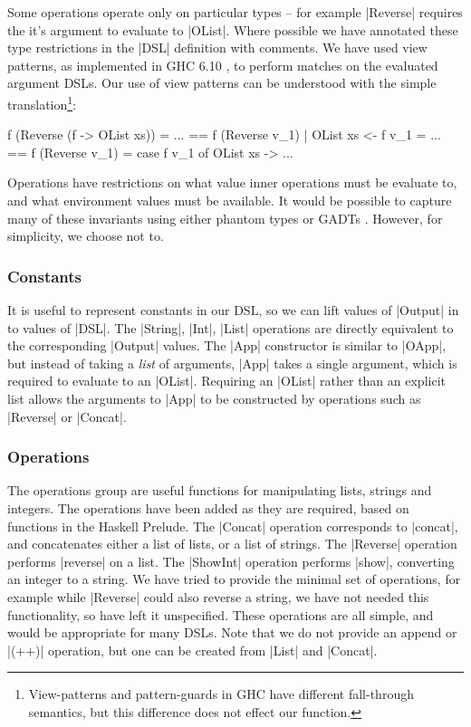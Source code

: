 \documentclass[preprint,draft]{sigplanconf}
\begin{document}
Some operations operate only on particular types -- for example |Reverse| requires the it's argument to evaluate to |OList|. Where possible we have annotated these type restrictions in the |DSL| definition with comments. We have used view patterns, as implemented in GHC 6.10 \cite{ghc_610}, to perform matches on the evaluated argument DSLs. Our use of view patterns can be understood with the simple translation\footnote{View-patterns and pattern-guards in GHC have different fall-through semantics, but this difference does not effect our function.}:

\ignore\begin{code}
f (Reverse (f -> OList xs)) = ...
    ==
f (Reverse v_1) | OList xs <- f v_1 = ...
    ==
f (Reverse v_1) = case f v_1 of OList xs -> ...
\end{code}

Operations have restrictions on what value inner operations must be evaluate to, and what environment values must be available. It would be possible to capture many of these invariants using either phantom types \cite{phantom_types} or GADTs \cite{spj:gadt}. However, for simplicity, we choose not to.

\subsubsection{Constants}

It is useful to represent constants in our DSL, so we can lift values of |Output| in to values of |DSL|. The |String|, |Int|, |List| operations are directly equivalent to the corresponding |Output| values. The |App| constructor is similar to |OApp|, but instead of taking a \textit{list} of arguments, |App| takes a single argument, which is required to evaluate to an |OList|. Requiring an |OList| rather than an explicit list allows the arguments to |App| to be constructed by operations such as |Reverse| or |Concat|.

\subsubsection{Operations}

The operations group are useful functions for manipulating lists, strings and integers. The operations have been added as they are required, based on functions in the Haskell Prelude. The |Concat| operation corresponds to |concat|, and concatenates either a list of lists, or a list of strings. The |Reverse| operation performs |reverse| on a list. The |ShowInt| operation performs |show|, converting an integer to a string. We have tried to provide the minimal set of operations, for example while |Reverse| could also reverse a string, we have not needed this functionality, so have left it unspecified. These operations are all simple, and would be appropriate for many DSLs. Note that we do not provide an append or |(++)| operation, but one can be created from |List| and |Concat|.
\end{document}
